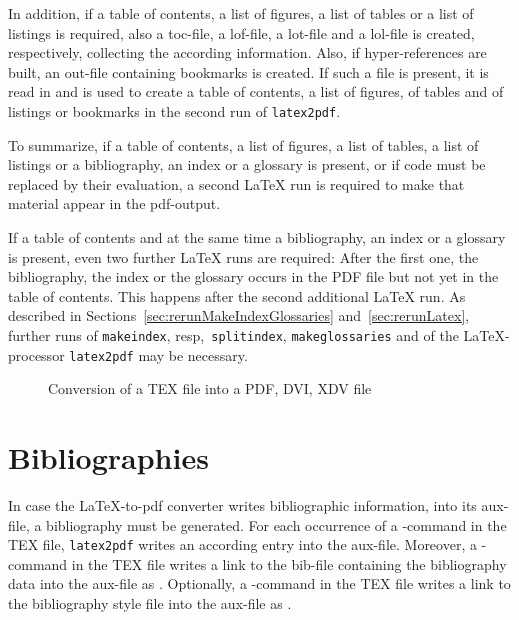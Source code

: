 In addition, if
a table of contents, a list of figures, a list of tables 
or a list of listings is required, 
also a toc-file, a lof-file, a lot-file and a lol-file is created,
respectively, 
collecting the according information. 
Also, if hyper-references are built, an \gls{out}-file 
containing bookmarks is created. 
If such a file is present, it is read in and is used
to create a table of contents, a list of figures, of tables and of listings 
or bookmarks in the second run of \texttt{latex2pdf}. 

To summarize, 
if a table of contents, a list of figures, a list of tables, a list of listings or 
a bibliography, an index or a glossary is present, 
or if code must be replaced by their evaluation, 
a second \LaTeX{} run is required to make that material appear in the pdf-output. 

If a table of contents and at the same time 
a bibliography, an index or a glossary is present, 
even two further \LaTeX{} runs are required: 
After the first one, the bibliography, the index or the glossary 
occurs in the PDF file but not yet in the table of contents. 
This happens after the second additional \LaTeX{} run. 
As described in Sections~\ref{sec:rerunMakeIndexGlossaries} and~\ref{sec:rerunLatex}, 
further runs of \texttt{makeindex}, resp,~\texttt{splitindex}, 
\texttt{makeglossaries} 
and of the \LaTeX-processor \texttt{latex2pdf} may be necessary. 

\begin{figure}[htb]
\centering
{}
\caption{\label{fig:tex2pdf}Conversion of a TEX file into a PDF, DVI, XDV file }
\end{figure}

\section{Bibliographies}\label{sec:bibtex}

In case the \LaTeX{}-to-pdf converter writes bibliographic information, 
into its aux-file, a bibliography must be generated. 
For each occurrence of a -command in the TEX file, 
\texttt{latex2pdf} writes an according entry  into the aux-file. 
Moreover, a -command in the TEX file 
writes a link to the bib-file containing the bibliography data 
into the aux-file as . 
Optionally, a -command in the TEX file 
writes a link to the bibliography style file 
into the aux-file as . 

